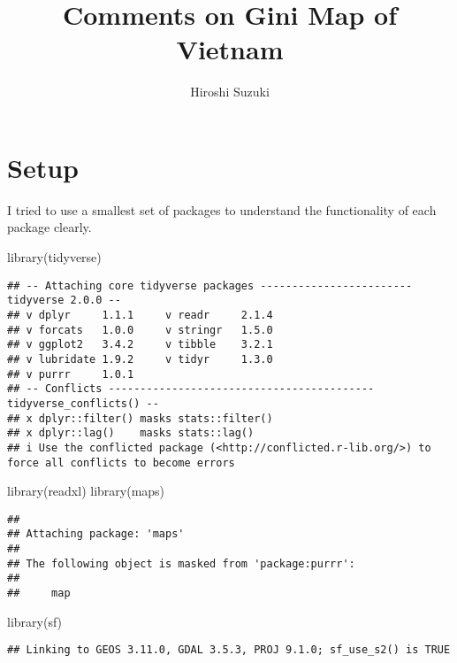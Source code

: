 \documentclass[
]{article}
\title{Comments on Gini Map of Vietnam}
\author{Hiroshi Suzuki}
\date{}
\newenvironment{Shaded}{\begin{snugshade}}{\end{snugshade}}
\newcommand{\FunctionTok}[1]{\textcolor[rgb]{0.00,0.00,0.00}{#1}}
\newcommand{\NormalTok}[1]{#1}
\begin{document}
\maketitle

\hypertarget{setup}{%
\section{Setup}\label{setup}}

I tried to use a smallest set of packages to understand the
functionality of each package clearly.

\begin{Shaded}
\begin{Highlighting}[]
\FunctionTok{library}\NormalTok{(tidyverse)}
\end{Highlighting}
\end{Shaded}

\begin{verbatim}
## -- Attaching core tidyverse packages ------------------------ tidyverse 2.0.0 --
## v dplyr     1.1.1     v readr     2.1.4
## v forcats   1.0.0     v stringr   1.5.0
## v ggplot2   3.4.2     v tibble    3.2.1
## v lubridate 1.9.2     v tidyr     1.3.0
## v purrr     1.0.1     
## -- Conflicts ------------------------------------------ tidyverse_conflicts() --
## x dplyr::filter() masks stats::filter()
## x dplyr::lag()    masks stats::lag()
## i Use the conflicted package (<http://conflicted.r-lib.org/>) to force all conflicts to become errors
\end{verbatim}

\begin{Shaded}
\begin{Highlighting}[]
\FunctionTok{library}\NormalTok{(readxl)}
\FunctionTok{library}\NormalTok{(maps)}
\end{Highlighting}
\end{Shaded}

\begin{verbatim}
## 
## Attaching package: 'maps'
## 
## The following object is masked from 'package:purrr':
## 
##     map
\end{verbatim}

\begin{Shaded}
\begin{Highlighting}[]
\FunctionTok{library}\NormalTok{(sf)}
\end{Highlighting}
\end{Shaded}

\begin{verbatim}
## Linking to GEOS 3.11.0, GDAL 3.5.3, PROJ 9.1.0; sf_use_s2() is TRUE
\end{verbatim}
\end{document}

